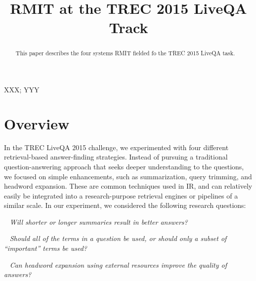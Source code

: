 \documentclass[a4paper,10pt,conference,compsocconf,final]{IEEEtran}
\newcommand{\opstyle}[1]{\mbox{\textsc{#1}}}
\newcommand{\myparagraph}[1]{\vspace*{1ex}\noindent{\textbf{#1.}}~}
\begin{document}

\title{RMIT at the TREC 2015 LiveQA Track}
\author{ 
}

\maketitle

\begin{abstract} 
This paper describes the four systems RMIT fielded fo 
the \opstyle{TREC} 2015 LiveQA task.
\end{abstract}

\begin{IEEEkeywords} 
XXX; YYY
\end{IEEEkeywords}

\section{Overview}
\label{overview}
In the TREC LiveQA 2015 challenge, we experimented with four
different retrieval-based answer-finding strategies.
Instead of pursuing a traditional question-answering approach that
seeks deeper understanding to the questions, we focused on simple
enhancements, such as summarization, query trimming, and headword
expansion.
These are common techniques used in IR, and can relatively easily be
integrated into a research-purpose retrieval engines or pipelines of
a similar scale.
In our experiment, we considered the following research
questions:

\myparagraph{RQ 1:}
{\emph{
Will shorter or longer summaries result in better answers?
}}

\myparagraph{RQ 2:}
{\emph{
Should all of the terms in a question be used, or should only a 
subset of ``important'' terms be used?
}}

\myparagraph{RQ 3:}
{\emph{
Can headword expansion using external resources improve the
quality of answers?
}}
\end{document}
